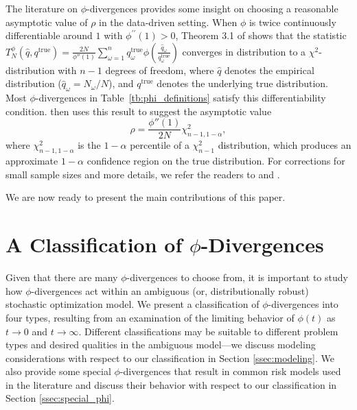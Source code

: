 \documentclass[ijoc,letterpaper]{informs3} %
\newcommand{\qtrue}{q^{\text{true}}}
\begin{document}
The literature on $\phi$-divergences provides some insight on choosing a reasonable asymptotic value of $\rho$ in the data-driven setting. 
When $\phi$ is twice continuously differentiable around $1$ with $\phi^{\prime \prime}(1)>0$, Theorem 3.1 of \cite{pardo2005statistical} shows that the statistic $T^\phi_N(\hat{q},\qtrue) = \frac{2N}{\phi''(1)} \sum_{\omega=1}^n \qtrue_\omega \phi\left(\frac{\hat{q}_\omega}{\qtrue_\omega}\right)$ converges in distribution to a $\chi^2$-distribution with $n-1$ degrees of freedom, where $\hat{q}$ denotes the empirical distribution ($\hat{q}_\omega = N_\omega/N$), and $\qtrue$ denotes the underlying true distribution.
Most $\phi$-divergences in Table~\ref{tb:phi_definitions} satisfy this differentiability condition.
\cite{bental2011robust} then uses this result to suggest the asymptotic value
\begin{equation} \label{eq:asymptotic_rho}
	\rho = \frac{\phi''(1)}{2N} \chi^2_{n-1,1-\alpha},
\end{equation}
where $\chi^2_{n-1,1-\alpha}$ is the $1-\alpha$ percentile of a $\chi^2_{n-1}$ distribution, which produces an approximate $1-\alpha$ confidence region on the true distribution.
For corrections for small sample sizes and more details, we refer the readers to \citep{pardo2005statistical} and \citep{bental2011robust}. 

We are now ready to present the main contributions of this paper. 

\section{A Classification of $\phi$-Divergences}
\label{sec:classification}

Given that there are many $\phi$-divergences to choose from, it is important to study how $\phi$-divergences act within an ambiguous (or, distributionally robust) stochastic optimization model. 
We present a classification of $\phi$-divergences into four types, resulting from an examination of the limiting behavior of $\phi(t)$ as $t \rightarrow 0$ and $t \rightarrow \infty$.
Different classifications may be suitable to different problem types and desired qualities in the ambiguous model---we discuss modeling considerations with respect to our classification in Section \ref{ssec:modeling}.
We also provide some special $\phi$-divergences that result in common risk models used in the literature and discuss their behavior with respect to our classification in Section \ref{ssec:special_phi}.
\end{document}
